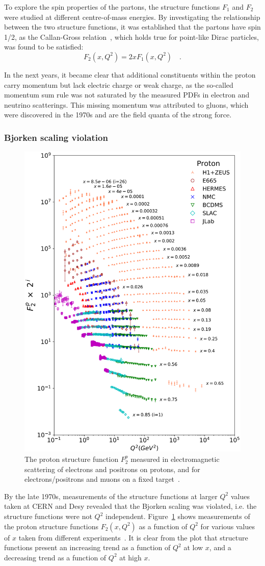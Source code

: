 To explore the spin properties of the partons, the structure functions $F_1$ and $F_2$ were studied at different centre-of-mass energies. By investigating the relationship between the two structure functions, it was established that the partons have spin 1/2, as the Callan-Gross relation~\cite{Callan:1969uq}, which holds true for point-like Dirac particles, was found to be satisfied:
\begin{equation*}
    F_2(x,Q^2) = 2x F_1(x,Q^2)\quad .
\end{equation*}

In the next years, it became clear that additional constituents within the proton carry momentum but lack electric charge or weak charge, as the so-called momentum sum rule was not saturated by the measured PDFs in electron and neutrino scatterings. This missing momentum was attributed to gluons, which were discovered in the 1970s and are the field quanta of the strong force.

\subsubsection{Bjorken scaling violation}
\begin{figure}[htb]
    \centering
    \includegraphics[width=0.6\linewidth]{Figures/Chapter 2/F2Results.png}
    \caption{The proton structure function $F^p_2$ measured in electromagnetic scattering of electrons and positrons on protons, and for electrons/positrons and muons on a fixed target~\cite{pdg}.}
    \label{fig:scaling_violation}
\end{figure}
By the late 1970s, measurements of the structure functions at larger $Q^2$ values taken at CERN and Desy revealed that the Bjorken scaling was violated, i.e. the structure functions were not $Q^2$ independent. Figure~\ref{fig:scaling_violation} shows measurements of the proton structure functions $F_2(x,Q^2)$ as a function of $Q^2$ for various values of $x$ taken from different experiments~\cite{pdg}. It is clear from the plot that structure functions present an increasing trend as a function of $Q^2$ at low $x$, and a decreasing trend as a function of $Q^2$ at high $x$. 

